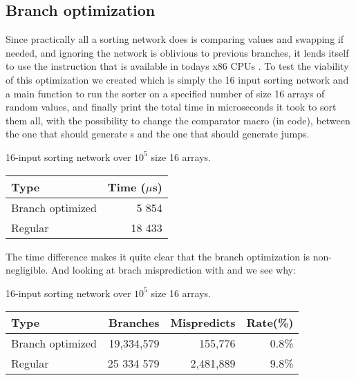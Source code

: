 \subsection{Branch optimization}
Since practically all a sorting network does is comparing values and swapping
if needed, and ignoring the network is oblivious to previous branches, it lends
itself to use the  instruction that is available in todays x86 CPUs
\cite{CCNS-2015}. To test the viability of this optimization we created
 which is simply the 16 input sorting network and a main function
to run the sorter on a specified number of size 16 arrays of random values, and
finally print the total time in microseconds it took to sort them all, with the
possibility to change the comparator macro (in code), between the one that
should generate s and the one that should generate jumps.

\begin{center}
    16-input sorting network over $10^5$ size 16 arrays.\\
    \begin{tabular}{lr}
        Type             & Time ($\mu$s)\\\hline
        Branch optimized & 5 854\\
        Regular          & 18 433\\
    \end{tabular}
\end{center}

The time difference makes it quite clear that the branch optimization is
non-negligible. And looking at brach misprediction with  and
 we see why:

\begin{center}
    16-input sorting network over $10^5$ size 16 arrays.\\
    \begin{tabular}{lrrr}
        Type             & Branches & Mispredicts & Rate(\%) \\\hline
        Branch optimized & 19,334,579& 155,776    &  0.8\%\\
        Regular          & 25 334 579& 2,481,889  &  9.8\%\\
    \end{tabular}
\end{center}

